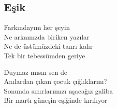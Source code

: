 \subsection{Eşik}

Farkındayım her şeyin \\
Ne arkamızda biriken yazılar \\
Ne de üstümüzdeki tanrı kalır \\
Tek bir tebessümden geriye

\noindent\newline
Duymaz mısın sen de \\
Anılardan çıkan çocuk çığlıklarını? \\
Sonunda sınırlarımızı aşacağız galiba \\
Bir martı güneşin eşiğinde kırılıyor